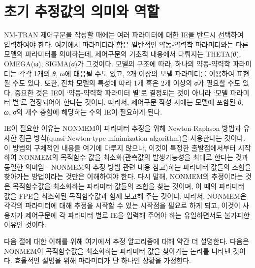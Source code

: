 \documentclass[
  11pt,
  krantz2, a4paper, twoside]{krantz}
\theoremstyle{definition}
\theoremstyle{definition}
\theoremstyle{definition}
\theoremstyle{remark}
\begin{document}
\hypertarget{IE-role}{%
\section{초기 추정값의 의미와 역할}\label{IE-role}}

NM-TRAN 제어구문을 작성할 때에는 여러 파라미터에 대한 IE을 반드시 선택하여 입력하여야 한다. 여기에서 파라미터라 함은 일반적인 약동-약력학 파라미터와는 다른 모델의 파라미터를 의미하는데, 제어구문의 기초적 내용에서 다뤄지는 THETA(\emph{θ}), OMEGA(\emph{ω}), SIGMA(\emph{σ})가 그것이다. 모델의 구조에 따라, 하나의 약동-약력학 파라미터는 각각 1개의 \emph{θ}, \emph{ω}에 대응될 수도 있고, 2개 이상의 모델 파라미터를 이용하여 표현될 수도 있다. 또한, 잔차 모델의 특성에 따라 1개 혹은 2개 이상의 \emph{σ}가 필요할 수도 있다. 중요한 것은 IE이 `약동-약력학 파라미터 별'로 결정되는 것이 아니라 `모델 파라미터 별'로 결정되어야 한다는 것이다. 따라서, 제어구문 작성 시에는 모델에 포함된 \emph{θ}, \emph{ω}, \emph{σ}의 개수 총합에 해당하는 수의 IE이 필요하게 된다.

IE이 필요한 이유는 NONMEM이 파라미터 추정을 위해 Newton-Raphson 방법과 유사한 접근 방식(quasi-Newton-type minimization algorithm)을 사용한다는 것이다. 이 방법의 구체적인 내용을 여기에 다루지 않으나, 이것이 특정한 출발점에서부터 시작하여 NONMEM의 목적함수 값을 최소화(관측값의 발생가능성을 최대로 한다는 것과 동일한 의미임 - NONMEM의 추정 방법 관련 내용 참고)하는 파라미터 값들의 조합을 찾아가는 방법이라는 것만은 이해하여야 한다. 다시 말해, NONMEM의 추정이라는 것은 목적함수값을 최소화하는 파라미터 값들의 조합을 찾는 것이며, 이 때의 파라미터 값을 FPE을 최소화된 목적함수값과 함께 보고해 주는 것이다. 따라서, NONMEM은 각각의 파라미터에 대해 추정을 시작할 수 있는 시작점을 필요로 하게 되고, 이것이 사용자가 제어구문에 각 파라미터 별로 IE을 입력해 주어야 하는 유일하면서도 불가피한 이유인 것이다.

다음 절에 대한 이해를 위해 여기에서 추정 알고리즘에 대해 약간 더 설명한다. 다음은 NONMEM이 목적함수값을 최소화하는 파라미터 값을 찾아가는 논리를 나타낸 것이다. 효율적인 설명을 위해 파라미터가 단 하나인 상황을 가정한다.
\end{document}
